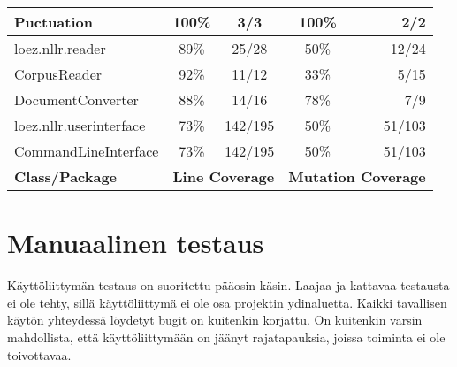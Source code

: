 \documentclass[12pt,a4paper]{article}
\begin{document}
\begin{tabular}{l |c |c |c |r}
\hspace{10 mm}Puctuation & 100\% & 3/3 & 100\% & 2/2 \\
\hline
loez.nllr.reader & 89\% & 25/28 & 50\% & 12/24 \\
\hspace{10 mm}CorpusReader & 92\% & 11/12 & 33\% & 5/15 \\
\hspace{10 mm}DocumentConverter & 88\% & 14/16 & 78\% & 7/9 \\
\hline
loez.nllr.userinterface & 73\% & 142/195 & 50\% & 51/103 \\
\hspace{10 mm}CommandLineInterface & 73\% & 142/195 & 50\% & 51/103 \\
\hline
\textbf{Class/Package}		&	\multicolumn{2}{|c}{\textbf{Line Coverage}} & \multicolumn{2}{|c}{\textbf{Mutation Coverage}} \\
\end{tabular}

\section{Manuaalinen testaus}
Käyttöliittymän testaus on suoritettu pääosin käsin. Laajaa ja kattavaa testausta ei ole tehty, sillä käyttöliittymä ei ole osa projektin ydinaluetta. Kaikki tavallisen käytön yhteydessä löydetyt bugit on kuitenkin korjattu. On kuitenkin varsin mahdollista, että käyttöliittymään on jäänyt rajatapauksia, joissa toiminta ei ole toivottavaa.
\end{document}
